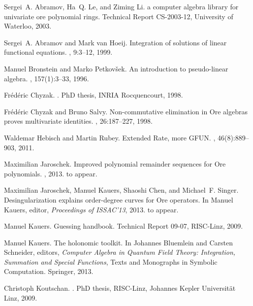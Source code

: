 \documentclass[11pt]{amsart}
\begin{document}
\begin{thebibliography}{10}

Sergei~A. Abramov, Ha~Q. Le, and Ziming Li.
 a computer algebra library for univariate ore polynomial
  rings.
\newblock Technical Report CS-2003-12, University of Waterloo, 2003.

Sergei~A. Abramov and Mark van Hoeij.
\newblock Integration of solutions of linear functional equations.
, 9:3--12, 1999.

Manuel Bronstein and Marko Petkov{\v s}ek.
\newblock An introduction to pseudo-linear algebra.
, 157(1):3--33, 1996.

Fr{\'e}d{\'e}ric Chyzak.
.
\newblock PhD thesis, INRIA Rocquencourt, 1998.

Fr{\'e}d{\'e}ric Chyzak and Bruno Salvy.
\newblock Non-commutative elimination in {O}re algebras proves multivariate
  identities.
, 26:187--227, 1998.

Waldemar Hebisch and Martin Rubey.
\newblock Extended {R}ate, more {GFUN}.
, 46(8):889--903, 2011.

Maximilian Jaroschek.
\newblock Improved polynomial remainder sequences for {Ore} polynomials.
, 2013.
\newblock to appear.

Maximilian Jaroschek, Manuel Kauers, Shaoshi Chen, and Michael~F. Singer.
\newblock Desingularization explains order-degree curves for {Ore} operators.
\newblock In Manuel Kauers, editor, {\em Proceedings of ISSAC'13}, 2013.
\newblock to appear.

Manuel Kauers.
\newblock Guessing handbook.
\newblock Technical Report 09-07, RISC-Linz, 2009.

Manuel Kauers.
\newblock The holonomic toolkit.
\newblock In Johannes Bluemlein and Carsten Schneider, editors, {\em Computer
  Algebra in Quantum Field Theory: Integration, Summation and Special
  Functions}, Texts and Monographs in Symbolic Computation. Springer, 2013.

Christoph Koutschan.
.
\newblock PhD thesis, RISC-Linz, Johannes Kepler Universit{\"a}t Linz, 2009.


\end{thebibliography}
\end{document}
